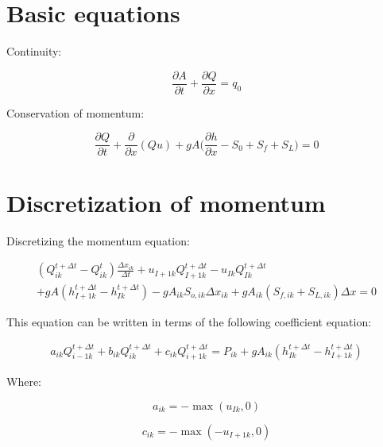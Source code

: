 \documentclass[11pt]{article}
\begin{document}
\section*{Basic equations}

Continuity:

\begin{equation}
  \frac{\partial A}{\partial t} + \frac{\partial Q}{\partial x} = q_0
\end{equation}

Conservation of momentum:

\begin{equation}
  \frac{\partial Q}{\partial t} + \frac{\partial}{\partial x} (Q u) + g A \biggl(\frac{\partial h}{\partial x} - S_0 + S_f + S_L \biggr) = 0
\end{equation}

\section*{Discretization of momentum}

Discretizing the momentum equation:

\begin{equation}
  \begin{split}
    (Q_{ik}^{t + \Delta t} - Q_{ik}^t) \frac{\Delta x_{ik}}{\Delta t} + u_{I+1k}
    Q_{I + 1k}^{t + \Delta t} - u_{Ik} Q_{Ik}^{t + \Delta t} \\
    + g A (h_{I+1k}^{t + \Delta t} - h_{Ik}^{t + \Delta t}) 
    - g A_{ik} S_{o,ik} \Delta x_{ik} + g
    A_{ik} (S_{f,ik} + S_{L,ik}) \Delta x = 0
  \end{split}
\end{equation}

This equation can be written in terms of the following coefficient equation:

\begin{equation}
  \begin{split}
    a_{ik} Q_{i - 1k}^{t + \Delta t} + b_{ik} Q_{ik}^{t + \Delta t} + c_{ik} Q_{i + 1k}^{t + \Delta t} =
    P_{ik} + g A_{ik} (h_{Ik}^{t + \Delta t} - h_{I+1k}^{t + \Delta t})
  \end{split}
\end{equation}

Where:

\begin{equation}
  a_{ik} = - \max(u_{Ik}, 0)
\end{equation}

\begin{equation}
  c_{ik} = - \max(-u_{I+1k}, 0)
\end{equation}
\end{document}
